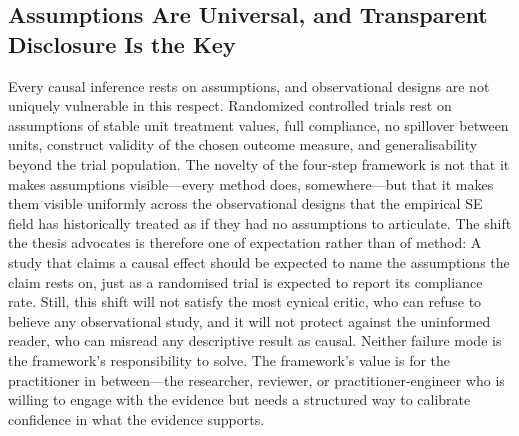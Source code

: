 \subsection{Assumptions Are Universal, and Transparent Disclosure Is the Key}
\label{sec:conclusion-transparency}

Every causal inference rests on assumptions, and observational designs are not uniquely vulnerable in this respect.
Randomized controlled trials rest on assumptions of stable unit treatment values, full compliance, no spillover between units, construct validity of the chosen outcome measure, and generalisability beyond the trial population.
The novelty of the four-step framework is not that it makes assumptions visible---every method does, somewhere---but that it makes them visible uniformly across the observational designs that the empirical SE field has historically treated as if they had no assumptions to articulate.
The shift the thesis advocates is therefore one of expectation rather than of method: A study that claims a causal effect should be expected to name the assumptions the claim rests on, just as a randomised trial is expected to report its compliance rate.
Still, this shift will not satisfy the most cynical critic, who can refuse to believe any observational study, and it will not protect against the uninformed reader, who can misread any descriptive result as causal.
Neither failure mode is the framework's responsibility to solve.
The framework's value is for the practitioner in between---the researcher, reviewer, or practitioner-engineer who is willing to engage with the evidence but needs a structured way to calibrate confidence in what the evidence supports.

